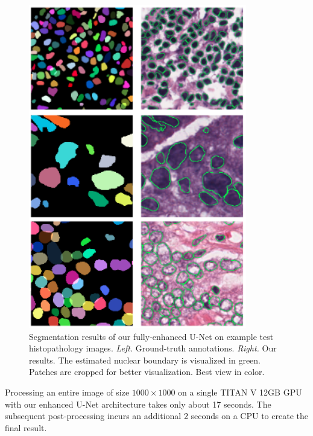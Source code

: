 \begin{figure}[thb]
    \centering
    \includegraphics[width=0.85\textwidth]{resources/5_Unet_gcnn_result.png}
    \caption{Segmentation results of our fully-enhanced U-Net on example test histopathology images. \textit{Left.} Ground-truth annotations. \textit{Right.} Our results. The estimated nuclear boundary is visualized in green. Patches are cropped for better visualization. Best view in color.}
    \label{fig:test_results}
\end{figure}


Processing an entire image of size $1000 \times 1000$ on a single TITAN V 12GB GPU with our enhanced U-Net architecture takes only about 17 seconds.
The subsequent post-processing incurs an additional 2 seconds on a CPU to create the final result. 


